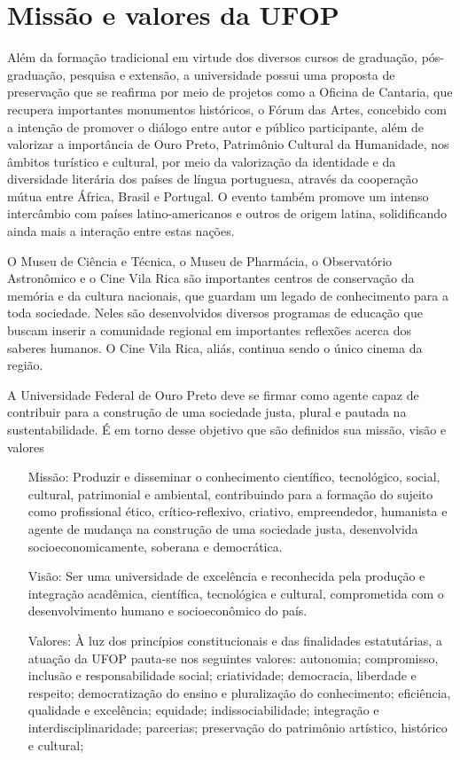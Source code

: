 \section{Missão e valores da UFOP}
%
Além da formação tradicional em virtude dos diversos cursos de graduação, pós-graduação, pesquisa e extensão, a universidade possui uma proposta de preservação que se reafirma por meio de  projetos como a Oficina de Cantaria, que recupera importantes monumentos históricos, o Fórum das Artes, concebido com a intenção de promover o diálogo entre autor e público participante, além de valorizar a importância de Ouro Preto, Patrimônio Cultural da Humanidade, nos âmbitos turístico e cultural, por meio da valorização da identidade e da diversidade literária dos países de língua portuguesa, através da cooperação mútua entre África, Brasil e Portugal. O evento também promove um intenso intercâmbio com países latino-americanos e outros de origem latina, solidificando ainda mais a interação entre estas nações.

O Museu de Ciência e Técnica, o Museu de Pharmácia, o Observatório Astronômico e o Cine Vila Rica são importantes centros de conservação da memória e da cultura nacionais, que guardam um legado de conhecimento para a toda sociedade. Neles são desenvolvidos diversos programas de educação que buscam inserir a comunidade regional em importantes reflexões acerca dos saberes humanos. O Cine Vila Rica, aliás, continua sendo o único cinema da região.

A Universidade Federal de Ouro Preto deve se firmar como agente capaz de contribuir para a construção de uma sociedade justa, plural e pautada na sustentabilidade. É em torno desse objetivo que são definidos sua missão, visão e valores
\begin{itemize}
	\item [Missão:] Produzir e disseminar o conhecimento científico, tecnológico, social, cultural, patrimonial e ambiental, contribuindo para a formação do sujeito como profissional ético, crítico-reflexivo, criativo, empreendedor, humanista e agente de mudança na construção de uma sociedade justa, desenvolvida socioeconomicamente, soberana e democrática.
	\item [Visão:] Ser uma universidade de excelência e reconhecida pela produção e integração acadêmica, científica, tecnológica e cultural, comprometida com o desenvolvimento humano e socioeconômico do país.
	\item [Valores:] À luz dos princípios constitucionais e das finalidades estatutárias, a atuação da UFOP pauta-se nos seguintes valores:
	\subitem autonomia;
	\subitem compromisso, inclusão e responsabilidade social;
	\subitem criatividade;
	\subitem democracia, liberdade e respeito;
	\subitem democratização do ensino e pluralização do conhecimento;
	\subitem eficiência, qualidade e excelência;
	\subitem equidade;
	\subitem indissociabilidade;	
	\subitem integração e interdisciplinaridade;
	\subitem parcerias;
	\subitem preservação do patrimônio artístico, histórico e cultural; 
\end{itemize}

